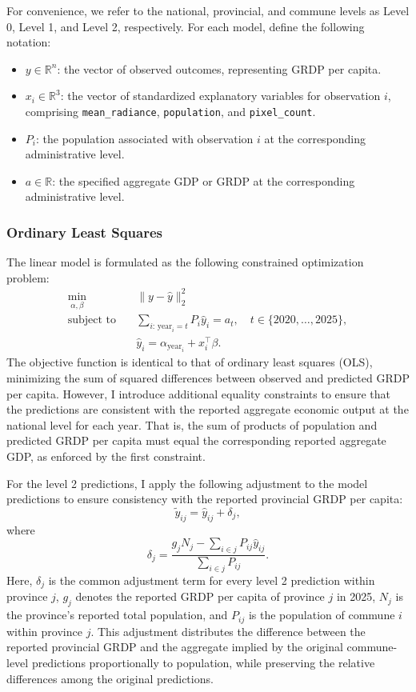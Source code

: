 \documentclass[11pt]{article} %
\begin{document}
For convenience, we refer to the national, provincial, and commune levels as Level 0, Level 1, and Level 2, respectively. For each model, define the following notation:
\begin{itemize}
    \item \(y \in \mathbb{R}^n\): the vector of observed outcomes, representing GRDP per capita.
    \item \(x_i \in \mathbb{R}^3\): the vector of standardized explanatory variables for observation \(i\), comprising \texttt{mean\_radiance}, \texttt{population}, and \texttt{pixel\_count}.
    \item \(P_i\): the population associated with observation \(i\) at the corresponding administrative level.
    \item \(a \in \mathbb{R}\): the specified aggregate GDP or GRDP at the corresponding administrative level.
\end{itemize}

\subsubsection{Ordinary Least Squares}
The linear model is formulated as the following constrained optimization problem:
\[
\begin{aligned}
\min_{\alpha,\beta}\quad
& \|y-\hat{y}\|_2^2\\
\text{subject to}\quad
& \sum_{i:\,\mathrm{year}_i=t} P_i\hat{y}_i=a_t,
\quad t\in\{2020,\ldots,2025\},\\
& \hat{y}_i=\alpha_{\mathrm{year}_i}+x_i^\top\beta.
\end{aligned}
\]
The objective function is identical to that of ordinary least squares (OLS), minimizing the sum of squared differences between observed and predicted GRDP per capita. However, I introduce additional equality constraints to ensure that the predictions are consistent with the reported aggregate economic output at the national level for each year. That is, the sum of products of population and predicted GRDP per capita must equal the corresponding reported aggregate GDP, as enforced by the first constraint.

For the level 2 predictions, I apply the following adjustment to the model predictions to ensure consistency with the reported provincial GRDP per capita:
\[
\tilde{y}_{ij}=\hat{y}_{ij}+\delta_j,
\]
where
\[
\delta_j=
\frac{
g_jN_j-\displaystyle\sum_{i\in j}P_{ij}\hat{y}_{ij}
}{
\displaystyle\sum_{i\in j}P_{ij}
}.
\]
Here, \(\delta_j\) is the common adjustment term for every level 2 prediction within province \(j\), \(g_j\) denotes the reported GRDP per capita of province \(j\) in 2025, \(N_j\) is the province's reported total population, and \(P_{ij}\) is the population of commune \(i\) within province \(j\). This adjustment distributes the difference between the reported provincial GRDP and the aggregate implied by the original commune-level predictions proportionally to population, while preserving the relative differences among the original predictions.
\end{document}
